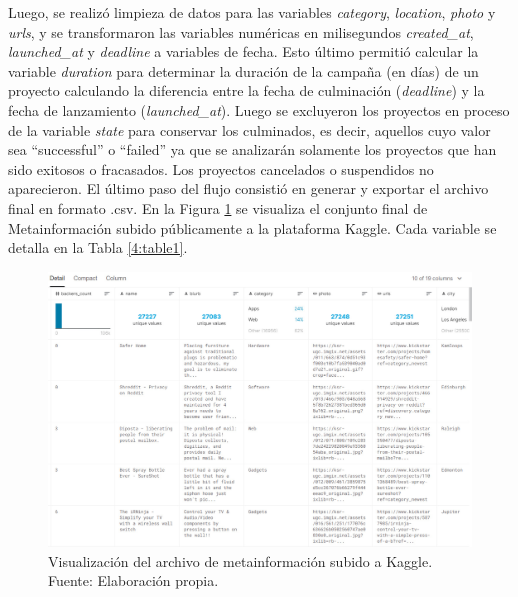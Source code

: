 Luego, se realizó limpieza de datos para las variables \textit{category}, \textit{location}, \textit{photo} y \textit{urls}, y se transformaron las variables numéricas en milisegundos \textit{created\_at}, \textit{launched\_at} y \textit{deadline} a variables de fecha. Esto último permitió calcular la variable \textit{duration} para determinar la duración de la campaña (en días) de un proyecto calculando la diferencia entre la fecha de culminación (\textit{deadline}) y la fecha de lanzamiento (\textit{launched\_at}). Luego se excluyeron los proyectos en proceso de la variable \textit{state} para conservar los culminados, es decir, aquellos cuyo valor sea “successful” o “failed” ya que se analizarán solamente los proyectos que han sido exitosos o fracasados. Los proyectos cancelados o suspendidos no aparecieron. El último paso del flujo consistió en generar y exportar el archivo final en formato .csv. En la Figura \ref{4:fig4} se visualiza el conjunto final de Metainformación subido públicamente a la plataforma Kaggle. Cada variable se detalla en la Tabla \ref{4:table1}.

\begin{figure}[h]
	\begin{center}
		\includegraphics[width=1\textwidth]{4/figures/metadata_kaggle_preview.jpg}
		\caption[Visualización del archivo de metainformación subido a Kaggle]{Visualización del archivo de metainformación subido a Kaggle.\\
			Fuente: Elaboración propia.}
		\label{4:fig4}
	\end{center}
\end{figure}

